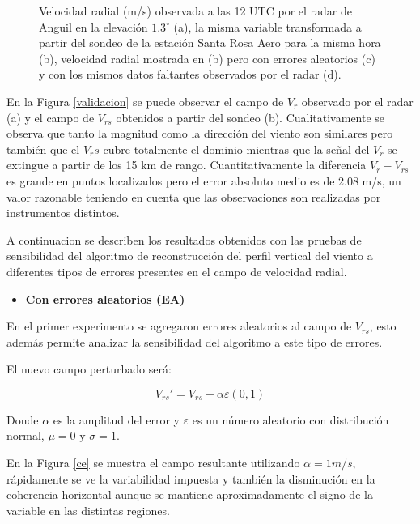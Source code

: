 \documentclass[12pt,spanish,oneside, a4paper]{book}
\providecommand{\tightlist}{%
  \setlength{\itemsep}{0pt}\setlength{\parskip}{0pt}}
\begin{document}
\begin{figure}
{}

\caption{Velocidad radial (m/s) observada a las 12 UTC por el radar de Anguil en la elevación $1.3^{\circ}$ (a), la misma variable transformada a partir del sondeo de la estación Santa Rosa Aero para la misma hora (b), velocidad radial mostrada en (b) pero con errores aleatorios (c) y con los mismos datos faltantes observados por el radar (d). \label{validacion}}\label{fig:validacion}
\end{figure}

En la Figura \ref{validacion} se puede observar el campo de \(V_r\)
observado por el radar (a) y el campo de \(V_{rs}\) obtenidos a partir
del sondeo (b). Cualitativamente se observa que tanto la magnitud como
la dirección del viento son similares pero también que el \(V_rs\) cubre
totalmente el dominio mientras que la señal del \(V_r\) se extingue a
partir de los 15 km de rango. Cuantitativamente la diferencia
\(V_r - V_{rs}\) es grande en puntos localizados pero el error absoluto
medio es de 2.08 m/s, un valor razonable teniendo en cuenta que las
observaciones son realizadas por instrumentos distintos.

A continuacion se describen los resultados obtenidos con las pruebas de
sensibilidad del algoritmo de reconstrucción del perfil vertical del
viento a diferentes tipos de errores presentes en el campo de velocidad
radial.

\begin{itemize}
\tightlist
\item
  \textbf{Con errores aleatorios (EA)}
\end{itemize}

En el primer experimento se agregaron errores aleatorios al campo de
\(V_{rs}\), esto además permite analizar la sensibilidad del algoritmo a
este tipo de errores.

El nuevo campo perturbado será:

\begin{equation} \label{eq-vr12}
V_{rs}'  = V_{rs} + \alpha \varepsilon(0,1)
\end{equation}

Donde \(\alpha\) es la amplitud del error y \(\varepsilon\) es un número
aleatorio con distribución normal, \(\mu = 0\) y \(\sigma= 1\).

En la Figura \ref{ce} se muestra el campo resultante utilizando
\(\alpha = 1 m/s\), rápidamente se ve la variabilidad impuesta y también
la disminución en la coherencia horizontal aunque se mantiene
aproximadamente el signo de la variable en las distintas regiones.
\end{document}
